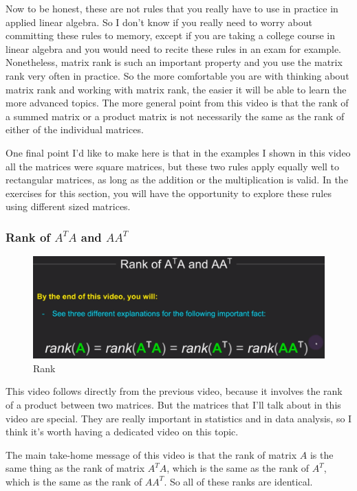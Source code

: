 \documentclass[fleqn,10pt]{olplainarticle}
\theoremstyle{definition}
\theoremstyle{remark}
\begin{document}
Now to be honest, these are not rules that you really have to use in practice in applied linear algebra. So I don't know if you really need to worry about committing these rules to memory, except if you are taking a college course in linear algebra and you would need to recite these rules in an exam for example. Nonetheless, matrix rank is such an important property and you use the matrix rank very often in practice. So the more comfortable you are with thinking about matrix rank and working with matrix rank, the easier it will be able to learn the more advanced topics. The more general point from this video is that the rank of a summed matrix or a product matrix is not necessarily the same as the rank of either of the individual matrices.

One final point I'd like to make here is that in the examples I shown in this video all the matrices were square matrices, but these two rules apply equally well to rectangular matrices, as long as the addition or the multiplication is valid. In the exercises for this section, you will have the opportunity to explore these rules using different sized matrices.

\pagebreak

\subsubsection*{Rank of $A^TA$ and $AA^T$}

\begin{figure}[ht]
	\centering
	\includegraphics[width=0.6\linewidth]{images/rank-22.png}
	\caption{Rank}
	\label{fig:rank_22}
\end{figure}

This video follows directly from the previous video, because it involves the rank of a product between two matrices. But the matrices that I'll talk about in this video are special. They are really important in statistics and in data analysis, so I think it's worth having a dedicated video on this topic.

The main take-home message of this video is that the rank of matrix $A$ is the same thing as the rank of matrix $A^TA$, which is the same as the rank of $A^T$, which is the same as the rank of $AA^T$. So all of these ranks are identical.
\end{document}
